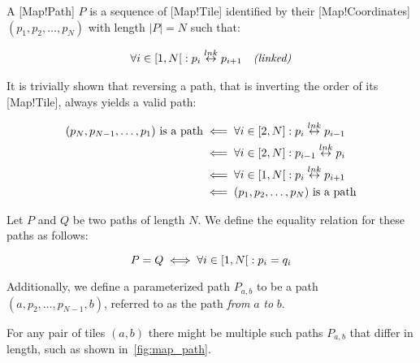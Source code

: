 A [Map!Path] \(P\) is a sequence of [Map!Tile] identified by their [Map!Coordinates] \((p_1, p_2, \ldots, p_N)\) with length \(|P| = N\) such that:

\begin{align}\label{eq:map_path}
    \forall i \in \interval[open right]{1}{N} &:
        p_i \overset{lnk}{\leftrightarrow} p_{i+1}&\textit{(linked)}
\end{align}

It is trivially shown that reversing a path, that is inverting the order of its [Map!Tile], always yields a valid path:

\begin{align}\label{eq:map_path_rev}
    (p_N, p_{N-1}, \ldots, p_1)\text{ is a path} &\impliedby
        \forall i \in \interval{2}{N} :
            p_i \overset{lnk}{\leftrightarrow} p_{i-1}\nonumber \\
    &\impliedby
        \forall i \in \interval{2}{N} :
            p_{i-1} \overset{lnk}{\leftrightarrow} p_i\nonumber \\
    &\impliedby
        \forall i \in \interval[open right]{1}{N} :
            p_i \overset{lnk}{\leftrightarrow} p_{i+1}\nonumber \\
    &\impliedby (p_1, p_2, \ldots, p_N)\text{ is a path}
\end{align}

Let \(P\) and \(Q\) be two paths of length \(N\).
We define the equality relation for these paths as follows:

\begin{equation}\label{eq:map_path_eq}
    P = Q \iff \forall i \in \interval[open right]{1}{N} : p_i = q_i
\end{equation}

Additionally, we define a parameterized path \(P_{a,b}\) to be a path \((a, p_2, \ldots, p_{N-1}, b)\), referred to as the path \emph{from} \(a\) \emph{to} \(b\).

For any pair of tiles \((a,b)\) there might be multiple such paths \(P_{a,b}\) that differ in length, such as shown in~\ref{fig:map_path}.

